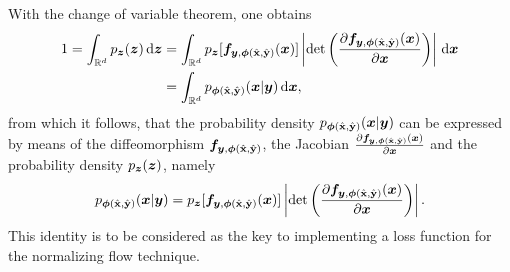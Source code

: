\documentclass[a4paper,11pt]{report}
\begin{document}
With the change of variable theorem, one obtains \begin{align}
\begin{aligned}
1 = \int_{\mathbb{R}^d} p_{\bm{z}}(\bm{z})\,\mathrm{d}\bm{z} &= \int_{\mathbb{R}^d}p_{\bm{z}}[\bm{f}_{\bm{y},\bm{\phi}(\hat{\boldsymbol{\mathbf{x}}},\hat{\boldsymbol{\mathbf{y}}})}(\bm{x})]\left|\det\left(\frac{\partial \bm{f}_{\bm{y},\bm{\phi}(\hat{\boldsymbol{\mathbf{x}}},\hat{\boldsymbol{\mathbf{y}}})}(\bm{x})}{\partial \bm{x}}\right)\right|\,\mathrm{d}\bm{x} \\ &= \int_{\mathbb{R}^d} p_{\bm{\phi}(\hat{\boldsymbol{\mathbf{x}}},\hat{\boldsymbol{\mathbf{y}}})}(\bm{x}|\bm{y})\,\mathrm{d}\bm{x},
\end{aligned}
\end{align} from which it follows, that the probability density $p_{\bm{\phi}(\hat{\boldsymbol{\mathbf{x}}},\hat{\boldsymbol{\mathbf{y}}})}(\bm{x}|\bm{y})$ can be expressed by means of the diffeomorphism $\bm{f}_{\bm{y},\bm{\phi}(\hat{\boldsymbol{\mathbf{x}}},\hat{\boldsymbol{\mathbf{y}}})}$, the Jacobian $\tfrac{\partial \bm{f}_{\bm{y},\bm{\phi}(\hat{\boldsymbol{\mathbf{x}}},\hat{\boldsymbol{\mathbf{y}}})}(\bm{x})}{\partial \bm{x}}$ and the probability density $p_{\bm{z}}(\bm{z})$, namely \begin{equation}\label{eq:heartofnormflowswithcontext}
p_{\bm{\phi}(\hat{\boldsymbol{\mathbf{x}}},\hat{\boldsymbol{\mathbf{y}}})}(\bm{x}|\bm{y}) = p_{\bm{z}}[\bm{f}_{\bm{y},\bm{\phi}(\hat{\boldsymbol{\mathbf{x}}},\hat{\boldsymbol{\mathbf{y}}})}(\bm{x})]\left|\det\left(\frac{\partial \bm{f}_{\bm{y},\bm{\phi}(\hat{\boldsymbol{\mathbf{x}}},\hat{\boldsymbol{\mathbf{y}}})}(\bm{x})}{\partial \bm{x}}\right)\right|.
\end{equation} This identity is to be considered as the key to implementing a loss function for the normalizing flow technique.
\end{document}
